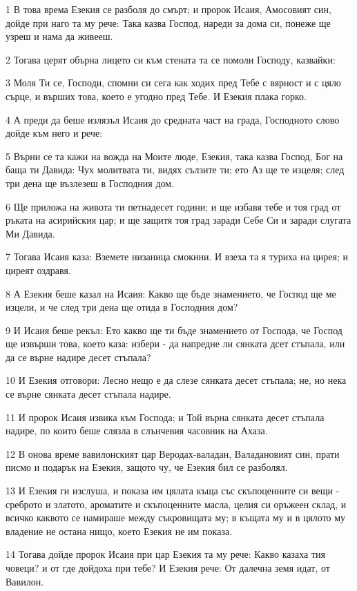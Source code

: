 \par 1 В това врема Езекия се разболя до смърт; и пророк Исаия, Амосовият син, дойде при наго та му рече: Така казва Господ, нареди за дома си, понеже ще узреш и нама да живееш.
\par 2 Тогава церят обърна лицето си към стената та се помоли Господу, казвайки:
\par 3 Моля Ти се, Господи, спомни си сега как ходих пред Тебе с вярност и с цяло сърце, и върших това, което е угодно пред Тебе. И Езекия плака горко.
\par 4 А преди да беше излязъл Исаия до средната част на града, Господното слово дойде към него и рече:
\par 5 Върни се та кажи на вожда на Моите люде, Езекия, така казва Господ, Бог на баща ти Давида: Чух молитвата ти, видях сълзите ти; ето Аз ще те изцеля; след три дена ще възлезеш в Господния дом.
\par 6 Ще приложа на живота ти петнадесет години; и ще избавя тебе и тоя град от ръката на асирийския цар; и ще защитя тоя град заради Себе Си и заради слугата Ми Давида.
\par 7 Тогава Исаия каза: Вземете низаница смокини. И взеха та я туриха на цирея; и циреят оздравя.
\par 8 А Езекия беше казал на Исаия: Какво ще бъде знамението, че Господ ще ме изцели, и че след три дена ще отида в Господния дом?
\par 9 И Исаия беше рекъл: Ето какво ще ти бъде знамението от Господа, че Господ ще извърши това, което каза: избери - да напредне ли сянката дсет стъпала, или да се върне надире десет стъпала?
\par 10 И Езекия отговори: Лесно нещо е да слезе сянката десет стъпала; не, но нека се върне сянката десет стъпала надире.
\par 11 И пророк Исаия извика към Господа; и Той върна сянката десет стъпала надире, по които беше слязла в слънчевия часовник на Ахаза.
\par 12 В онова време вавилонският цар Веродах-валадан, Валадановият син, прати писмо и подарък на Езекия, защото чу, че Езекия бил се разболял.
\par 13 И Езекия ги изслуша, и показа им цялата къща със скъпоценните си вещи - среброто и златото, ароматите и скъпоценните масла, целия си оръжеен склад, и всичко каквото се намираше между съкровищата му; в къщата му и в цялото му владение не остана нищо, което Езекия не им показа.
\par 14 Тогава дойде пророк Исаия при цар Езекия та му рече: Какво казаха тия човеци? и от где дойдоха при тебе? И Езекия рече: От далечна земя идат, от Вавилон.

